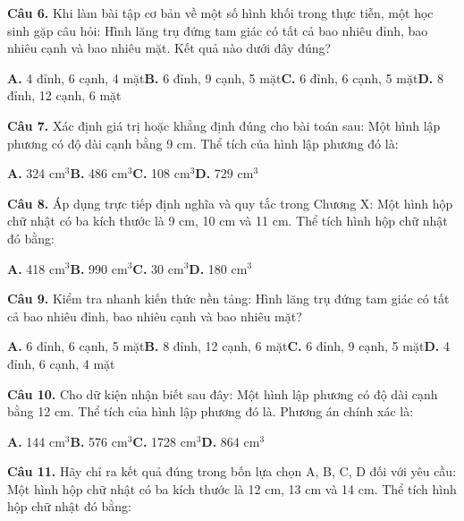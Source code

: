 \documentclass[11pt,a4paper]{article}
\begin{document}
\textbf{\color{primary} Câu 6.} Khi làm bài tập cơ bản về một số hình khối trong thực tiễn, một học sinh gặp câu hỏi: Hình lăng trụ đứng tam giác có tất cả bao nhiêu đỉnh, bao nhiêu cạnh và bao nhiêu mặt. Kết quả nào dưới đây đúng?\par
\hspace*{1.5em}\textbf{A.} 4 đỉnh, 6 cạnh, 4 mặt\quad\quad \textbf{B.} 6 đỉnh, 9 cạnh, 5 mặt\quad\quad \textbf{C.} 6 đỉnh, 6 cạnh, 5 mặt\quad\quad \textbf{D.} 8 đỉnh, 12 cạnh, 6 mặt\par\vspace{2pt}
\textbf{\color{primary} Câu 7.} Xác định giá trị hoặc khẳng định đúng cho bài toán sau: Một hình lập phương có độ dài cạnh bằng 9 cm. Thể tích của hình lập phương đó là:\par
\hspace*{1.5em}\textbf{A.} 324 cm$^3$\quad\quad \textbf{B.} 486 cm$^3$\quad\quad \textbf{C.} 108 cm$^3$\quad\quad \textbf{D.} 729 cm$^3$\par\vspace{2pt}
\textbf{\color{primary} Câu 8.} Áp dụng trực tiếp định nghĩa và quy tắc trong Chương X: Một hình hộp chữ nhật có ba kích thước là 9 cm, 10 cm và 11 cm. Thể tích hình hộp chữ nhật đó bằng:\par
\hspace*{1.5em}\textbf{A.} 418 cm$^3$\quad\quad \textbf{B.} 990 cm$^3$\quad\quad \textbf{C.} 30 cm$^3$\quad\quad \textbf{D.} 180 cm$^3$\par\vspace{2pt}
\textbf{\color{primary} Câu 9.} Kiểm tra nhanh kiến thức nền tảng: Hình lăng trụ đứng tam giác có tất cả bao nhiêu đỉnh, bao nhiêu cạnh và bao nhiêu mặt?\par
\hspace*{1.5em}\textbf{A.} 6 đỉnh, 6 cạnh, 5 mặt\quad\quad \textbf{B.} 8 đỉnh, 12 cạnh, 6 mặt\quad\quad \textbf{C.} 6 đỉnh, 9 cạnh, 5 mặt\quad\quad \textbf{D.} 4 đỉnh, 6 cạnh, 4 mặt\par\vspace{2pt}
\textbf{\color{primary} Câu 10.} Cho dữ kiện nhận biết sau đây: Một hình lập phương có độ dài cạnh bằng 12 cm. Thể tích của hình lập phương đó là. Phương án chính xác là:\par
\hspace*{1.5em}\textbf{A.} 144 cm$^3$\quad\quad \textbf{B.} 576 cm$^3$\quad\quad \textbf{C.} 1728 cm$^3$\quad\quad \textbf{D.} 864 cm$^3$\par\vspace{2pt}
\textbf{\color{primary} Câu 11.} Hãy chỉ ra kết quả đúng trong bốn lựa chọn A, B, C, D đối với yêu cầu: Một hình hộp chữ nhật có ba kích thước là 12 cm, 13 cm và 14 cm. Thể tích hình hộp chữ nhật đó bằng:\par
\end{document}
